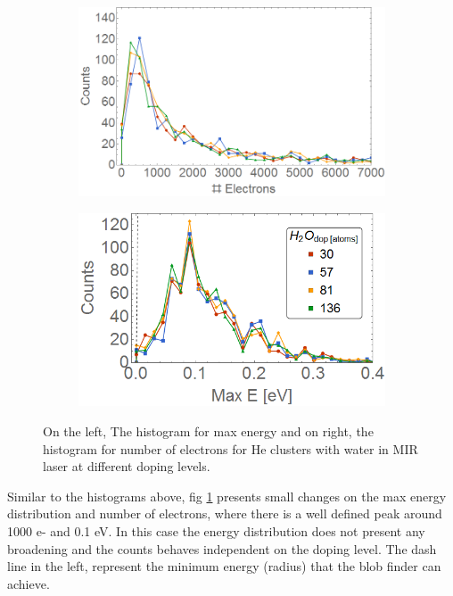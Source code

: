 \begin{figure}[h!]
\centering
\begin{subfigure}[l]{0.49\textwidth}
\includegraphics[width=1\textwidth]{../Images/results/MIR_He_waterDop/Helec.png} 
\end{subfigure}
\begin{subfigure}[l]{0.49\textwidth}
\includegraphics[width=1\textwidth]{../Images/results/MIR_He_waterDop/Heberg.png}   				\end{subfigure}
\caption[MIR He-Water. Histograms]{On the left, The histogram for max energy and on right, the histogram for number of electrons for He clusters with water in MIR laser at different doping levels.}
\label{fig:histowaterdop}
\end{figure}

Similar to the histograms above, fig \ref{fig:histowaterdop} presents small changes on the max energy distribution and number of electrons, where there is a well defined peak around 1000 e- and 0.1 eV. In this case the energy distribution does not present any broadening and the counts behaves independent on the doping level. The dash line in the left, represent the minimum energy (radius) that the blob finder can achieve.

